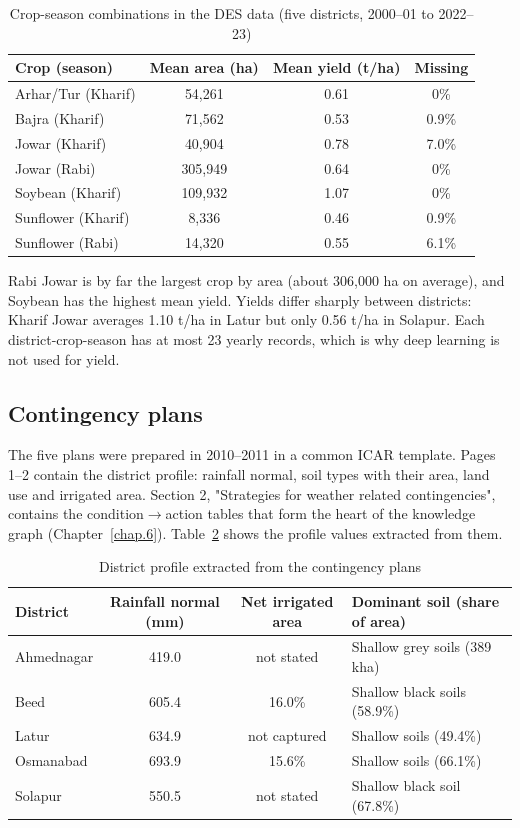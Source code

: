 \begin{table}[H]
	\centering
	\caption{Crop-season combinations in the DES data (five districts, 2000--01 to 2022--23)}
	\label{tab:crops}
	\begin{tabular}{lccc}
		\toprule
		\textbf{Crop (season)} & \textbf{Mean area (ha)} & \textbf{Mean yield (t/ha)} & \textbf{Missing} \\
		\midrule
		Arhar/Tur (Kharif) & 54,261 & 0.61 & 0\% \\
		Bajra (Kharif) & 71,562 & 0.53 & 0.9\% \\
		Jowar (Kharif) & 40,904 & 0.78 & 7.0\% \\
		Jowar (Rabi) & 305,949 & 0.64 & 0\% \\
		Soybean (Kharif) & 109,932 & 1.07 & 0\% \\
		Sunflower (Kharif) & 8,336 & 0.46 & 0.9\% \\
		Sunflower (Rabi) & 14,320 & 0.55 & 6.1\% \\
		\bottomrule
	\end{tabular}
\end{table}

Rabi Jowar is by far the largest crop by area (about 306,000 ha on average), and Soybean has the highest mean yield. Yields differ sharply between districts: Kharif Jowar averages 1.10 t/ha in Latur but only 0.56 t/ha in Solapur. Each district-crop-season has at most 23 yearly records, which is why deep learning is not used for yield.

\subsection{Contingency plans}
The five plans were prepared in 2010--2011 in a common ICAR template. Pages 1--2 contain the district profile: rainfall normal, soil types with their area, land use and irrigated area. Section 2, "Strategies for weather related contingencies", contains the condition$\to$action tables that form the heart of the knowledge graph (Chapter~\ref{chap.6}). Table~\ref{tab:profile} shows the profile values extracted from them.

\begin{table}[H]
	\centering
	\caption{District profile extracted from the contingency plans}
	\label{tab:profile}
	\small
	\setlength{\tabcolsep}{4pt}\begin{tabular}{lccl}
		\toprule
		\textbf{District} & \textbf{Rainfall normal (mm)} & \textbf{Net irrigated area} & \textbf{Dominant soil (share of area)} \\
		\midrule
		Ahmednagar & 419.0 & not stated & Shallow grey soils (389 kha) \\
		Beed       & 605.4 & 16.0\% & Shallow black soils (58.9\%) \\
		Latur      & 634.9 & not captured & Shallow soils (49.4\%) \\
		Osmanabad  & 693.9 & 15.6\% & Shallow soils (66.1\%) \\
		Solapur    & 550.5 & not stated & Shallow black soil (67.8\%) \\
		\bottomrule
	\end{tabular}
\end{table}

